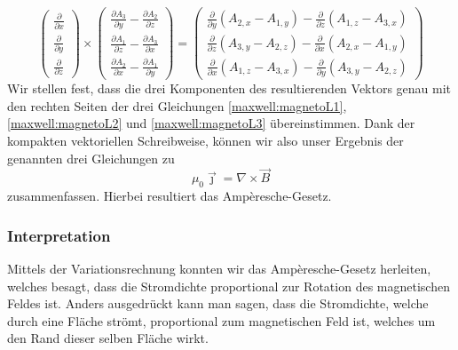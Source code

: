 \begin{equation}
	\renewcommand{\arraystretch}{1.9}
	\begin{pmatrix}
		\displaystyle
		\frac{\partial}{\partial x} \\
		\displaystyle
		\frac{\partial}{\partial y} \\
		\displaystyle
		\frac{\partial}{\partial z}
	\end{pmatrix}
	\times
	\begin{pmatrix}
		\displaystyle
		\frac{\partial A_3}{\partial y} -\frac{\partial A_2}{\partial z}\\
		\displaystyle
		\frac{\partial A_1}{\partial z} -\frac{\partial A_3}{\partial x}\\
		\displaystyle
		\frac{\partial A_2}{\partial x} -\frac{\partial A_1}{\partial y}
	\end{pmatrix}
	=
	\begin{pmatrix}
		\displaystyle
		\frac{\partial}{\partial y}(A_{2,x}-A_{1,y}) - \frac{\partial}{\partial z}(A_{1,z}-A_{3,x})	\\
		\displaystyle
		\frac{\partial}{\partial z}(A_{3,y}-A_{2,z}) - \frac{\partial}{\partial x}(A_{2,x}-A_{1,y}) \\
		\displaystyle
		\frac{\partial}{\partial x}(A_{1,z}-A_{3,x}) - \frac{\partial}{\partial y}(A_{3,y}-A_{2,z})
	\end{pmatrix}
\end{equation}
Wir stellen fest, dass die drei Komponenten des resultierenden Vektors genau mit den rechten Seiten der drei Gleichungen \eqref{maxwell:magnetoL1}, \eqref{maxwell:magnetoL2} und \eqref{maxwell:magnetoL3} übereinstimmen.
Dank der kompakten vektoriellen Schreibweise, können wir also unser Ergebnis der genannten drei Gleichungen zu
\[ 
\mu_0\vec{\jmath} 
= 
\nabla \times \vec{B}
 \]
zusammenfassen. Hierbei resultiert das Ampèresche-Gesetz.

\subsubsection{Interpretation}

Mittels der Variationsrechnung konnten wir das Ampèresche-Gesetz herleiten, welches besagt, dass die Stromdichte proportional zur Rotation des magnetischen Feldes ist. Anders ausgedrückt kann man sagen, dass die Stromdichte, welche durch eine Fläche strömt, proportional zum magnetischen Feld ist, welches um den Rand dieser selben Fläche wirkt.


